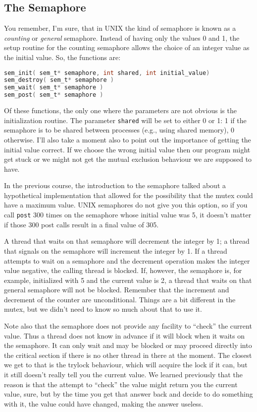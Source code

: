 \subsection*{The Semaphore}

You remember, I'm sure, that in UNIX the kind of semaphore is known as a \textit{counting} or \textit{general} semaphore. Instead of having only the values 0 and 1, the setup routine for the counting semaphore allows the choice of an integer value as the initial value. So, the functions are:

\begin{lstlisting}[language=C]
sem_init( sem_t* semaphore, int shared, int initial_value)
sem_destroy( sem_t* semaphore )
sem_wait( sem_t* semaphore )
sem_post( sem_t* semaphore )
\end{lstlisting}

Of these functions, the only one where the parameters are not obvious is the initialization routine. The parameter \texttt{shared} will be set to either 0 or 1: 1 if the semaphore is to be shared between processes (e.g., using shared memory), 0 otherwise. I'll also take a moment also to point out the importance of getting the initial value correct. If we choose the wrong initial value then our program might get stuck or we might not get the mutual exclusion behaviour we are supposed to have.

In the previous course, the introduction to the semaphore talked about a hypothetical implementation that allowed for the possibility that the mutex could have a maximum value. UNIX semaphores do not give you this option, so if you call \texttt{post} 300 times on the semaphore whose initial value was 5, it doesn't matter if those 300 post calls result in a final value of 305.

A thread that waits on that semaphore will decrement the integer by 1; a thread that signals on the semaphore will increment the integer by 1. If a thread attempts to wait on a semaphore and the decrement operation makes the integer value negative, the calling thread is blocked. If, however, the semaphore is, for example, initialized with 5 and the current value is 2, a thread that waits on that general semaphore will not be blocked. Remember that the increment and decrement of the counter are unconditional. Things are a bit different in the mutex, but we didn't need to know so much about that to use it.

Note also that the semaphore does not provide any facility to ``check'' the current value. Thus a thread does not know in advance if it will block when it waits on the semaphore. It can only wait and may be blocked or may proceed directly into the critical section if there is no other thread in there at the moment. The closest we get to that is the trylock behaviour, which will acquire the lock if it can, but it still doesn't really tell you the current value. We learned previously that the reason is that the attempt to ``check'' the value might return you the current value, sure, but by the time you get that answer back and decide to do something with it, the value could have changed, making the answer useless.

